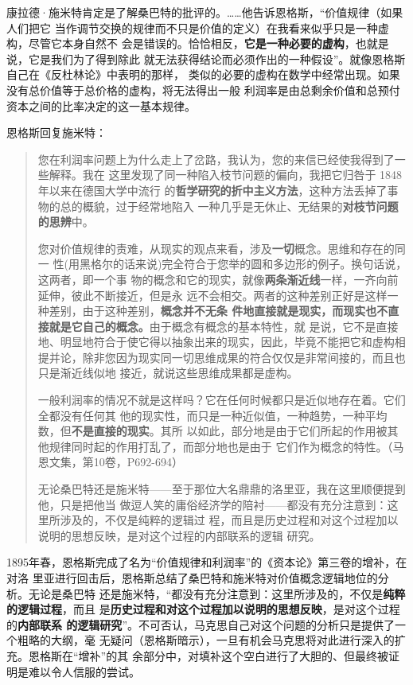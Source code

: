 康拉德·施米特肯定是了解桑巴特的批评的。……他告诉恩格斯，“价值规律（如果人们把它
当作调节交换的规律而不只是价值的定义）在我看来似乎只是一种虚构，尽管它本身自然不
会是错误的。恰恰相反，\textbf{它是一种必要的虚构}，也就是说，它是我们为了得到除此
就无法获得结论而必须作出的一种假设”。就像恩格斯自己在《反杜林论》中表明的那样，
类似的必要的虚构在数学中经常出现。如果没有总价值等于总价格的虚构，将无法得出一般
利润率是由总剩余价值和总预付资本之间的比率决定的这一基本规律。

恩格斯回复施米特：
\begin{quotation}
  您在利润率问题上为什么走上了岔路，我认为，您的来信已经使我得到了一些解释。我在
  这里发现了同一种陷入枝节问题的偏向，我把它归咎于 1848年以来在德国大学中流行
  的\textbf{哲学研究的折中主义方法}，这种方法丢掉了事物的总的概貌，过于经常地陷入
  一种几乎是无休止、无结果的\textbf{对枝节问题的思辨}中。

  您对价值规律的责难，从现实的观点来看，涉及\textbf{一切}概念。思维和存在的同一
  性(用黑格尔的话来说)完全符合于您举的圆和多边形的例子。换句话说，这两者，即一个事
  物的概念和它的现实，就像\textbf{两条渐近线}一样，一齐向前延伸，彼此不断接近，但是永
  远不会相交。两者的这种差别正好是这样一种差别，由于这种差别，\textbf{概念并不无条
    件地直接就是现实，而现实也不直接就是它自己的概念。}由于概念有概念的基本特性，就
  是说，它不是直接地、明显地符合于使它得以抽象出来的现实，因此，毕竟不能把它和虚构相
  提并论，除非您因为现实同一切思维成果的符合仅仅是非常间接的，而且也只是渐近线似地
  接近，就说这些思维成果都是虚构。

  一般利润率的情况不就是这样吗？它在任何时候都只是近似地存在着。它们全都没有任何其
  他的现实性，而只是一种近似值，一种趋势，一种平均数，但\textbf{不是直接的现实}。其所
  以如此，部分地是由于它们所起的作用被其他规律同时起的作用打乱了，而部分地也是由于
  它们作为概念的特性。（马恩文集，第10卷，P692-694）

  无论桑巴特还是施米特——至于那位大名鼎鼎的洛里亚，我在这里顺便提到他，只是把他当
  做逗人笑的庸俗经济学的陪衬——都没有充分注意到：这里所涉及的，不仅是纯粹的逻辑过
  程，而且是历史过程和对这个过程加以说明的思想反映，是对这个过程的内部联系的逻辑
  研究。 
\end{quotation}
1895年春，恩格斯完成了名为“价值规律和利润率”的《资本论》第三卷的增补，在对洛
里亚进行回击后，恩格斯总结了桑巴特和施米特对价值概念逻辑地位的分析。无论是桑巴特
还是施米特，“都没有充分注意到：这里所涉及的，不仅是\textbf{纯粹的逻辑过程}，而且
是\textbf{历史过程和对这个过程加以说明的思想反映}，是对这个过程的\textbf{内部联系
  的逻辑研究}”。不可否认，马克思自己对这个问题的分析只是提供了一个粗略的大纲，毫
无疑问（恩格斯暗示），一旦有机会马克思将对此进行深入的扩充。恩格斯在“增补”的其
余部分中，对填补这个空白进行了大胆的、但最终被证明是难以令人信服的尝试。

